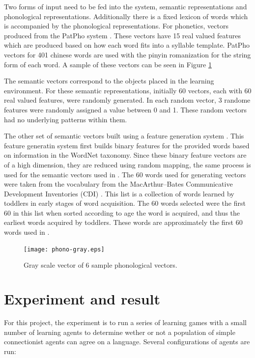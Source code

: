 \documentclass[a4paper,11pt]{article}
\begin{document}
Two forms of input need to be fed into the system, semantic representations and
phonological representations.  Additionally there is a fixed lexicon of words
which is accompanied by the phonological representations.  For phonetics,
vectors produced from the PatPho system \cite{LiPatPho}.  These vectors have 15
real valued features which are produced based on how each word fits into a
syllable template.  PatPho vectors for 401 chinese words are used with the
pinyin romanization for the string form of each word.  A sample of these vectors
can be seen in Figure \ref{fig:phono}

The semantic vectors correspond to the objects placed in the learning environment.
For these semantic representations, initially 60 vectors, each with 60 real valued
features, were randomly generated.  In each random vector, 3 randome features were
randomly assigned a value between 0 and 1.  These random vectors had no underlying
patterns within them.

The other set of semantic vectors built using a feature generation system
\cite{HarmWordNetFeature}.  This feature generatin system first builds binary
features for the provided words based on information in the WordNet taxonomy.
Since these binary feature vectors are of a high dimension, they are reduced
using random mapping, the same process is used for the semantic vectors used in
\cite{LiDevLex}.  The 60 words used for generating vectors were taken from the
vocabulary from the MacArthur–Bates Communicative Development Inventories (CDI) \cite{DaleCDI}.
This list is a collection of words learned by toddlers in early stages of word
acquisition.  The 60 words selected were the first 60 in this list when sorted
according to age the word is acquired, and thus the earliest words acquired by
toddlers.  These words are approximately the first 60 words used in \cite{LiDevLex}.

\begin{figure} \center \texttt{[image: phono-gray.eps]}
\caption{Gray scale vector of 6 sample phonological vectors.} \label{fig:phono} \end{figure}

\section{Experiment and result}
For this project, the experiment is to run a series of learning games with a
small number of learning agents to determine wether or not a population of simple connectionist
agents can agree on a language.  Several configurations of agents are run:
\end{document}
